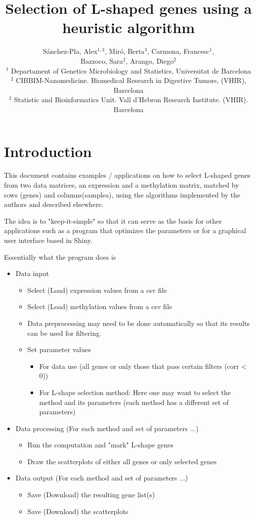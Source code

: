 \documentclass[a4paper,10pt]{article}\usepackage[]{graphicx}\usepackage[]{xcolor}
\title{Selection of L-shaped genes using a heuristic algorithm}
\author{S\'anchez-Pla, Alex$^{1,3}$, Mir\'o, Berta$^3$, Carmona, Francesc$^1$, \\ Bazzoco, Sara$^2$, Arango, Diego$^2$\\
  $^1$ Departament of Genetics Microbiology and Statistics, Universitat de Barcelona\\
  $^2$ CIBBIM-Nanomedicine. Biomedical Research in Digestive Tumors, (VHIR), Barcelona\\
  $^3$ Statistic and Bioinformatics Unit. Vall d'Hebron Research Institute.  (VHIR). Barcelona}
\date{}
\begin{document}



\maketitle

\thispagestyle{empty}

\tableofcontents

\section{Introduction}

This document contains examples / applications on how to select L-shaped genes from two data matrices, an expression and a methylation matrix, matched by rows (genes) and columns(samplea), using the algorithms implemented by the authors and described elsewhere.
 

The idea is to "keep-it-simple" so that it can serve as the basis for other applications such as a program that optimizes the parameters or for a graphical user interface based in Shiny.

Essentially what the program does is
\begin{itemize}
  \item Data input
  \begin{itemize} 
    \item Select (Load) expression values from a csv file
    \item Select (Load) methylation values from a csv file
    \item Data preprocessing may need to be done automatically so that its results can be used for filtering.
    \item Set parameter values
    \begin{itemize}
      \item For data use (all genes or only those that pass certain filters (corr < 0))
      \item For L-shape selection method: Here one may want to select the method and its parameters (each method has a different set of parameters)
    \end{itemize}
  \end{itemize}
  \item Data processing (For each method and set of parameters ...)
  \begin{itemize} 
    \item Run the computation and "mark" L-shape genes
    \item Draw the scatterplots of either all genes or only selected genes
  \end{itemize}
  \item Data output (For each method and set of parameters ...)
  \begin{itemize} 
    \item Save (Download) the resulting gene list(s)
    \item Save (Download) the scatterplots 
  \end{itemize}
\end{itemize}
\end{document}
